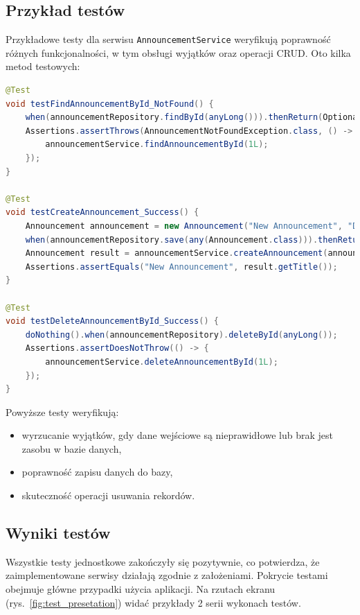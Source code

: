 \subsection{Przykład testów}
Przykładowe testy dla serwisu \texttt{AnnouncementService} weryfikują poprawność różnych funkcjonalności, w tym obsługi wyjątków oraz operacji CRUD. Oto kilka metod testowych:

\begin{lstlisting}[language=Java, style=JavaStyle, caption= Przykłądowe testy dla \texttt{AnnouncementService}]
@Test
void testFindAnnouncementById_NotFound() {
    when(announcementRepository.findById(anyLong())).thenReturn(Optional.empty());
    Assertions.assertThrows(AnnouncementNotFoundException.class, () -> {
        announcementService.findAnnouncementById(1L);
    });
}

@Test
void testCreateAnnouncement_Success() {
    Announcement announcement = new Announcement("New Announcement", "Description");
    when(announcementRepository.save(any(Announcement.class))).thenReturn(announcement);
    Announcement result = announcementService.createAnnouncement(announcement);
    Assertions.assertEquals("New Announcement", result.getTitle());
}

@Test
void testDeleteAnnouncementById_Success() {
    doNothing().when(announcementRepository).deleteById(anyLong());
    Assertions.assertDoesNotThrow(() -> {
        announcementService.deleteAnnouncementById(1L);
    });
}
\end{lstlisting}

Powyższe testy weryfikują: 
\begin{itemize}
    \item wyrzucanie wyjątków, gdy dane wejściowe są nieprawidłowe lub brak jest zasobu w bazie danych,
    \item poprawność zapisu danych do bazy,
    \item skuteczność operacji usuwania rekordów.
\end{itemize}

\subsection{Wyniki testów}
Wszystkie testy jednostkowe zakończyły się pozytywnie, co potwierdza, że zaimplementowane serwisy działają zgodnie z założeniami. Pokrycie testami obejmuje główne przypadki użycia aplikacji. Na rzutach ekranu (rys.~\ref{fig:test_presetation}) widać przykłady 2 serii wykonach testów.

